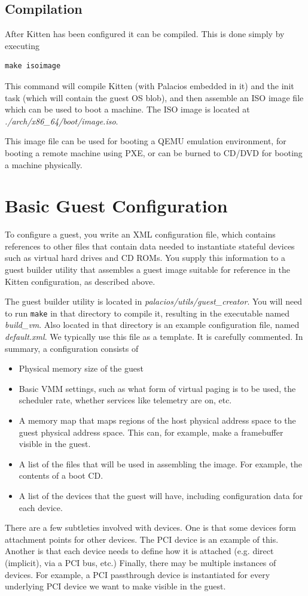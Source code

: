 \documentclass[11pt]{article}
\begin{document}
\subsection{Compilation}

After Kitten has been configured it can be compiled.  This is done
simply by executing
\begin{verbatim}
make isoimage
\end{verbatim}
This command will compile Kitten (with Palacios embedded in it) and
the init task (which will contain the guest OS blob), and then
assemble an ISO image file which can be used to boot a machine.  The ISO
image is located at {\em ./arch/x86\_64/boot/image.iso}.  

This image file can be used for booting a QEMU emulation environment,
for booting a remote machine using PXE, or can be burned to CD/DVD for
booting a machine physically. 


\section{Basic Guest Configuration}
\label{sec:guestconfig}

To configure a guest, you write an XML configuration file, which
contains references to other files that contain data needed to
instantiate stateful devices such as virtual hard drives and CD ROMs.
You supply this information to a guest builder utility that assembles
a guest image suitable for reference in the Kitten configuration, as
described above.  

The guest builder utility is located in {\em
palacios/utils/guest\_creator}.  You will need to run \verb.make. in that
directory to compile it, resulting in the executable named {\em
build\_vm}.  Also located in that directory is an example configuration
file, named {\em default.xml}.   We typically use this file as a
template.  It is carefully commented.  In summary, a configuration
consists of
\begin{itemize}
\item Physical memory size of the guest
\item Basic VMM settings, such as what form of virtual paging is to be
used, the scheduler rate, whether services like telemetry are on, etc.
\item A memory map that maps regions of the host physical address
space to the guest physical address space.  This can, for example,
make a framebuffer visible in the guest.
\item A list of the files that will be used in assembling the image.
For example, the contents of a boot CD.
\item A list of the devices that the guest will have, including
configuration data for each device.
\end{itemize}
There are a few subtleties involved with devices.  One is that some
devices form attachment points for other devices.  The PCI device is
an example of this.  Another is that each device needs to define how
it is attached (e.g. direct (implicit), via a PCI bus, etc.)
Finally, there may be multiple instances of devices.   For example, a
PCI passthrough device is instantiated for every underlying PCI device
we want to make visible in the guest. 
\end{document}

